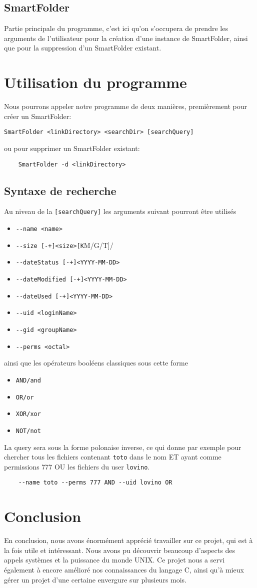 \documentclass[a4paper]{article}
\begin{document}
\subsection{SmartFolder}
Partie principale du programme, c'est ici qu'on s'occupera de prendre les arguments de l'utilisateur pour la création d'une instance de SmartFolder, ainsi que pour la suppression d'un SmartFolder existant.
\section{Utilisation du programme}
Nous pourrons appeler notre programme de deux manières, premièrement pour créer un SmartFolder:
\begin{verbatim}
SmartFolder <linkDirectory> <searchDir> [searchQuery]
\end{verbatim}
ou pour supprimer un SmartFolder existant:
\begin{verbatim}
	SmartFolder -d <linkDirectory>
\end{verbatim}
\subsection{Syntaxe de recherche}
Au niveau de la \verb+[searchQuery]+ les arguments suivant pourront être utilisés
\begin{itemize}
	\item \verb/--name <name>/
	\item \verb/--size [-+]<size>[K/M/G/T]/
	\item \verb/--dateStatus [-+]<YYYY-MM-DD>/
	\item \verb/--dateModified [-+]<YYYY-MM-DD>/
	\item \verb/--dateUsed [-+]<YYYY-MM-DD>/
	\item \verb/--uid <loginName>/
	\item \verb/--gid <groupName>/
	\item \verb/--perms <octal>/
\end{itemize}
ainsi que les opérateurs booléens classiques sous cette forme
\begin{itemize}
	\item \verb+AND/and+
	\item \verb+OR/or+
	\item \verb+XOR/xor+
	\item \verb+NOT/not+
\end{itemize}
La query sera sous la forme polonaise inverse, ce qui donne par exemple pour chercher tous les fichiers contenant \verb+toto+ dans le nom ET ayant comme permissions 777 OU les fichiers du user \verb+lovino+.
\begin{verbatim}
	--name toto --perms 777 AND --uid lovino OR
\end{verbatim}
\section{Conclusion}
En conclusion, nous avons énormément apprécié travailler sur ce projet, qui est à la fois utile et intéressant. Nous avons pu découvrir beaucoup d'aspects des appels systèmes et la puissance du monde UNIX. Ce projet nous a servi également à encore amélioré nos connaissances du langage C, ainsi qu'à mieux gérer un projet d'une certaine envergure sur plusieurs mois.
\end{document}
